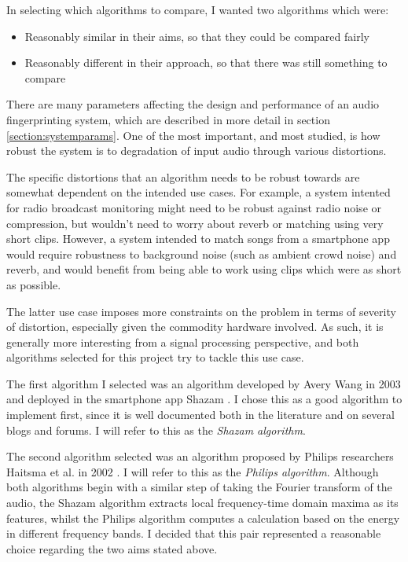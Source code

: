 \documentclass[12pt,a4paper,twoside,openright]{report}
\begin{document}
In selecting which algorithms to compare, I wanted two algorithms which were:

\begin{itemize}
  \item Reasonably similar in their aims, so that they could be compared fairly
  \item Reasonably different in their approach, so that there was still something to compare
\end{itemize}

There are many parameters affecting the design and performance of an audio fingerprinting system, which are described in more detail in section \ref{section:systemparams}. One of the most important, and most studied, is how robust the system is to degradation of input audio through various distortions. 

The specific distortions that an algorithm needs to be robust towards are somewhat dependent on the intended use cases. For example, a system intented for radio broadcast monitoring might need to be robust against radio noise or compression, but wouldn't need to worry about reverb or matching using very short clips. However, a system intended to match songs from a smartphone app would require robustness to background noise (such as ambient crowd noise) and reverb, and would benefit from being able to work using clips which were as short as possible.

The latter use case imposes more constraints on the problem in terms of severity of distortion, especially given the commodity hardware involved. As such, it is generally more interesting from a signal processing perspective, and both algorithms selected for this project try to tackle this use case.

The first algorithm I selected was an algorithm developed by Avery Wang in 2003 and deployed in the smartphone app Shazam \cite{Wang03}. I chose this as a good algorithm to implement first, since it is well documented both in the literature and on several blogs and forums. I will refer to this as the \textit{Shazam algorithm}.

The second algorithm selected was an algorithm proposed by Philips researchers Haitsma et al. in 2002 \cite{Haitsma02}. I will refer to this as the \textit{Philips algorithm}. Although both algorithms begin with a similar step of taking the Fourier transform of the audio, the Shazam algorithm extracts local frequency-time domain maxima as its features, whilst the Philips algorithm computes a calculation based on the energy in different frequency bands. I decided that this pair represented a reasonable choice regarding the two aims stated above.
\end{document}
